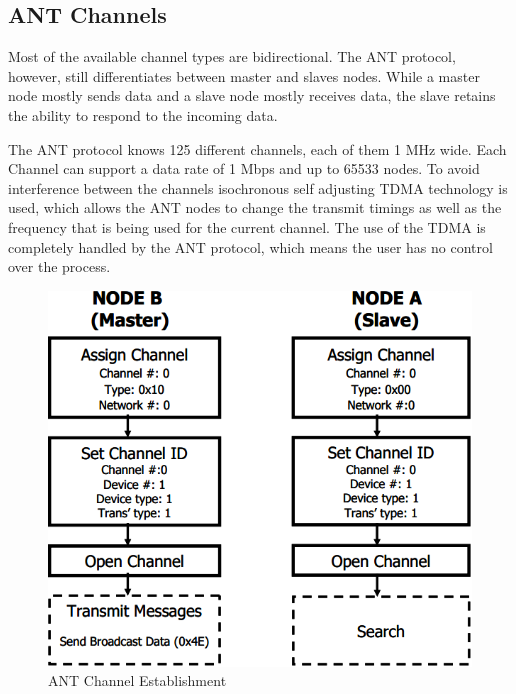 \subsection{ANT Channels}
Most of the available channel types are bidirectional. The ANT protocol, however, still differentiates between master and slaves nodes. While a master node mostly sends data and a slave node mostly receives data, the slave retains the ability to respond to the incoming data.

The ANT protocol knows 125 different channels, each of them 1 MHz wide. Each Channel can support a data rate of 1 Mbps and up to 65533 nodes. To avoid interference between the channels isochronous self adjusting TDMA technology is used, which allows the ANT nodes to change the transmit timings as well as the frequency that is being used for the current channel. The use of the TDMA is completely handled by the ANT protocol, which means the user has no control over the process.

\begin{figure}[h]
	\centering
	\includegraphics[scale=0.7]{content/images/ANTsetup.png}
	\caption{ANT Channel Establishment\cite{DynastreamInnovationsInc.2013}}\label{fig:antsetup}
\end{figure}

